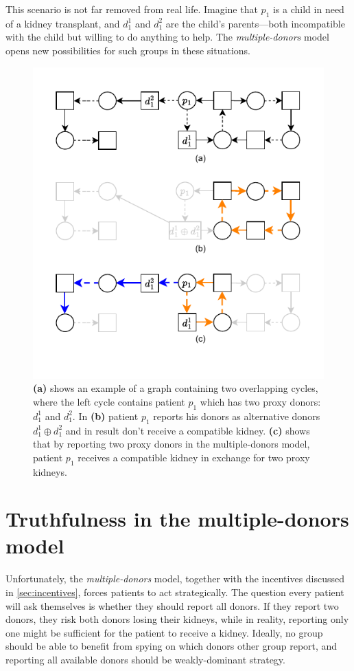 This scenario is not far removed from real life. Imagine that $p_1$ is a child in need of a kidney transplant, and $d_1^1$ and $d_1^2$ are the child’s parents—both incompatible with the child but willing to do anything to help. The \textit{multiple-donors} model opens new possibilities for such groups in these situations.

\begin{figure}
    \centering
    \includegraphics{data/incentive_motivation_example2.pdf}
    \caption[An example showing the benefit of reporting two proxy donors in multiple-donors model]{\textbf{(a)} shows an example of a graph containing two overlapping cycles, where the left cycle contains patient $p_1$ which has two proxy donors: $d_1^1$ and $d_1^2$. In \textbf{(b)} patient $p_1$ reports his donors as alternative donors $d_1^1 \oplus d_1^2$ and in result don't receive a compatible kidney. \textbf{(c)} shows that by reporting two proxy donors in the multiple-donors model, patient $p_1$ receives a compatible kidney in exchange for two proxy kidneys.}
    \label{fig:incentive_motivation_example2}
\end{figure}

\section{Truthfulness in the multiple-donors model}
Unfortunately, the \textit{multiple-donors} model, together with the incentives discussed in \autoref{sec:incentives}, forces patients to act strategically. The question every patient will ask themselves is whether they should report all donors. If they report two donors, they risk both donors losing their kidneys, while in reality, reporting only one might be sufficient for the patient to receive a kidney.  Ideally, no group should be able to benefit from spying on which donors other group report, and reporting all available donors should be weakly-dominant strategy.

